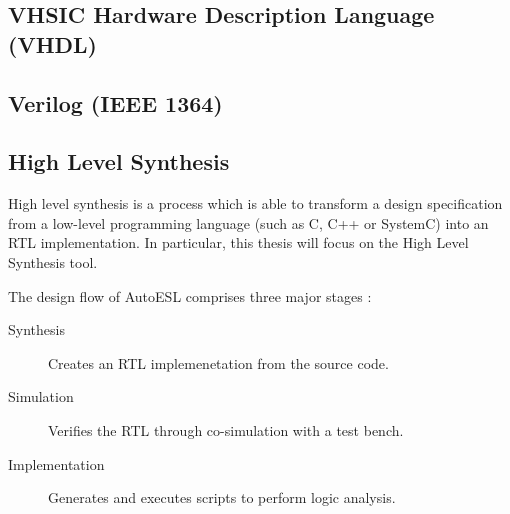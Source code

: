 
\subsection{VHSIC Hardware Description Language (VHDL)}

\subsection{Verilog (IEEE 1364)}

\subsection{High Level Synthesis}
High level synthesis is a process which is able to transform a design 
specification from a low-level programming language (such as C, C++ or SystemC) 
into an \gls{RTL} implementation. In particular, this thesis will focus on the 
 High Level Synthesis tool.

The design flow of AutoESL comprises three major stages \cite{XILINX:Tutorial}:
\begin{description}
    \item[Synthesis] Creates an \gls{RTL} implemenetation from the source code.
    \item[Simulation] Verifies the \gls{RTL} through co-simulation with a test
        bench.
    \item[Implementation] Generates and executes scripts to perform logic 
        analysis.
\end{description}
